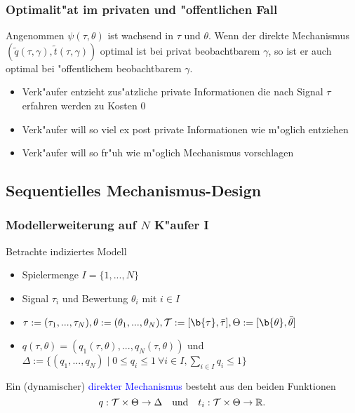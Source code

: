 \begin{frame}
\frametitle{Optimalit"at im privaten und "offentlichen Fall}
\justifying
\begin{thmP}
  Angenommen $\psi(\tau, \theta)$ ist wachsend in $\tau$ und $\theta$. Wenn der direkte Mechanismus $(\tilde{q}(\tau, \gamma), \tilde{t}(\tau, \gamma))$ optimal ist bei privat beobachtbarem $\gamma$, so ist er
  auch optimal bei "offentlichem beobachtbarem $\gamma$.
\end{thmP}
\begin{itemize}
  \item Verk"aufer entzieht zus"atzliche private Informationen die nach Signal $\tau$ erfahren werden zu Kosten $0$
  \item Verk"aufer will so viel ex post private Informationen wie m"oglich entziehen
  \item Verk"aufer will so fr"uh wie m"oglich Mechanismus vorschlagen
\end{itemize}
\end{frame}

\subsection{Sequentielles Mechanismus-Design}
\begin{frame}
\frametitle{Modellerweiterung auf $N$ K"aufer I}
\justifying
Betrachte indiziertes Modell
\begin{itemize}
  \item Spielermenge $I = \{ 1,...,N \}$
  \item Signal $\tau_{i}$ und Bewertung $\theta_{i}$ mit $i \in I$
  \item $\tau:= (\tau_{1}, ...,\tau_{N}), \theta := (\theta_{1}, ...,\theta_{N}), \Tau := [\b{\tau}, \bar{\tau}], \Theta := [\b{\theta}, \bar{\theta}]$
  \item $q(\tau, \theta) = (q_{1}(\tau, \theta), ...,q_{N}(\tau, \theta))$ und $\Delta := \{ (q_{1},...,q_{N}) \mid 0 \leq q_{i} \leq 1 \ \forall i \in I, \sum_{i \in I} q_{i} \leq 1 \}$
\end{itemize}
\begin{thmD}
  Ein (dynamischer) \textcolor{blue}{direkter Mechanismus} besteht aus den beiden Funktionen
  \begin{equation*}
    q: \mathcal{T} \times \Theta \rightarrow \Delta
    \quad \text{und} \quad
    t_{i}:\mathcal{T} \times \Theta \rightarrow \mathbb{R}.
  \end{equation*}
\end{thmD}
\end{frame}

